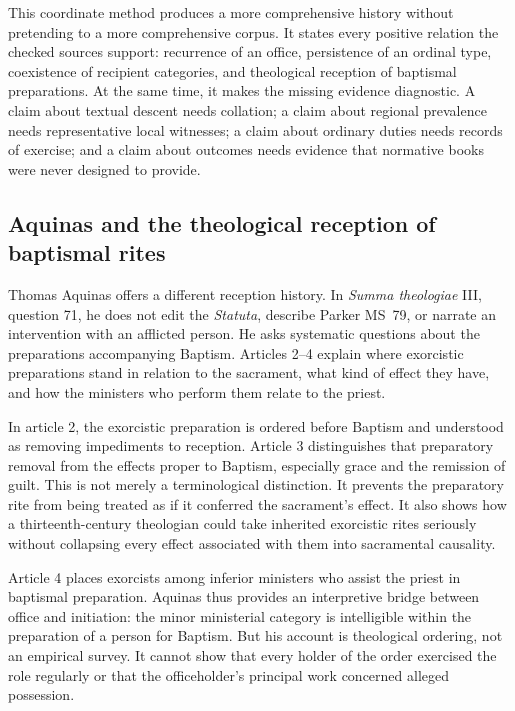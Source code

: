 This coordinate method produces a more comprehensive history without
pretending to a more comprehensive corpus. It states every positive relation
the checked sources support: recurrence of an office, persistence of an
ordinal type, coexistence of recipient categories, and theological reception
of baptismal preparations. At the same time, it makes the missing evidence
diagnostic. A claim about textual descent needs collation; a claim about
regional prevalence needs representative local witnesses; a claim about
ordinary duties needs records of exercise; and a claim about outcomes needs
evidence that normative books were never designed to provide.

\subsection{Aquinas and the theological reception of baptismal rites}

Thomas Aquinas offers a different reception history. In \emph{Summa
theologiae} III, question 71, he does not edit the \emph{Statuta}, describe
Parker MS~79, or narrate an intervention with an afflicted person. He asks
systematic questions about the preparations accompanying Baptism. Articles
2--4 explain where exorcistic preparations stand in relation to the sacrament,
what kind of effect they have, and how the ministers who perform them relate
to the priest.

In article 2, the exorcistic preparation is ordered before Baptism and
understood as removing impediments to reception. Article 3 distinguishes that
preparatory removal from the effects proper to Baptism, especially grace and
the remission of guilt. This is not merely a terminological distinction. It
prevents the preparatory rite from being treated as if it conferred the
sacrament's effect. It also shows how a thirteenth-century theologian could
take inherited exorcistic rites seriously without collapsing every effect
associated with them into sacramental causality.

Article 4 places exorcists among inferior ministers who assist the priest in
baptismal preparation. Aquinas thus provides an interpretive bridge between
office and initiation: the minor ministerial category is intelligible within
the preparation of a person for Baptism. But his account is theological
ordering, not an empirical survey. It cannot show that every holder of the
order exercised the role regularly or that the officeholder's principal work
concerned alleged possession.

